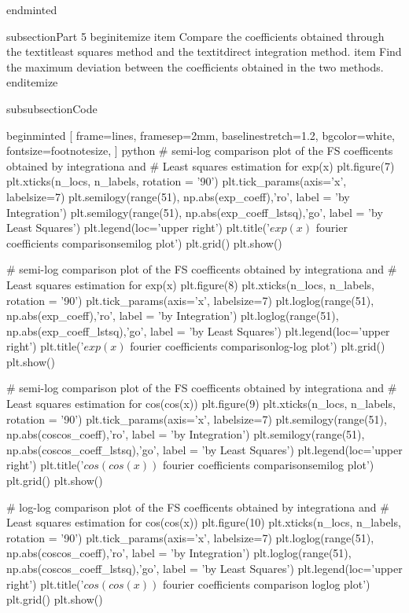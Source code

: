 end{minted}



subsection{Part 5}
begin{itemize}
    item Compare the coefficients obtained through the textit{least squares method} and the textit{direct integration} method.
    item Find the maximum deviation between the coefficients obtained in the two methods.
end{itemize}

subsubsection{Code}

begin{minted}
[
frame=lines,
framesep=2mm,
baselinestretch=1.2,
bgcolor=white,
fontsize=footnotesize,
]
{python}
# semi-log comparison plot of the FS coefficents obtained by integrationa and
# Least squares estimation for exp(x)
plt.figure(7)
plt.xticks(n_locs, n_labels, rotation = '90')
plt.tick_params(axis='x', labelsize=7)
plt.semilogy(range(51), np.abs(exp_coeff),'ro', label = 'by Integration')
plt.semilogy(range(51), np.abs(exp_coeff_lstsq),'go', label = 'by Least Squares')
plt.legend(loc='upper right')
plt.title('$exp(x)$ fourier coefficients comparisonsemilog plot')
plt.grid()
plt.show()

# semi-log comparison plot of the FS coefficents obtained by integrationa and
# Least squares estimation for exp(x)
plt.figure(8)
plt.xticks(n_locs, n_labels, rotation = '90')
plt.tick_params(axis='x', labelsize=7)
plt.loglog(range(51), np.abs(exp_coeff),'ro', label = 'by Integration')
plt.loglog(range(51), np.abs(exp_coeff_lstsq),'go', label = 'by Least Squares')
plt.legend(loc='upper right')
plt.title('$exp(x)$ fourier coefficients comparisonlog-log plot')
plt.grid()
plt.show()

# semi-log comparison plot of the FS coefficents obtained by integrationa and
# Least squares estimation for cos(cos(x))
plt.figure(9)
plt.xticks(n_locs, n_labels, rotation = '90')
plt.tick_params(axis='x', labelsize=7)
plt.semilogy(range(51), np.abs(coscos_coeff),'ro', label = 'by Integration')
plt.semilogy(range(51), np.abs(coscos_coeff_lstsq),'go', label = 'by Least Squares')
plt.legend(loc='upper right')
plt.title('$cos(cos(x))$ fourier coefficients comparisonsemilog plot')
plt.grid()
plt.show()

# log-log comparison plot of the FS coefficents obtained by integrationa and
# Least squares estimation for cos(cos(x))
plt.figure(10)
plt.xticks(n_locs, n_labels, rotation = '90')
plt.tick_params(axis='x', labelsize=7)
plt.loglog(range(51), np.abs(coscos_coeff),'ro', label = 'by Integration')
plt.loglog(range(51), np.abs(coscos_coeff_lstsq),'go', label = 'by Least Squares')
plt.legend(loc='upper right')
plt.title('$cos(cos(x))$ fourier coefficients comparison loglog plot')
plt.grid()
plt.show()

